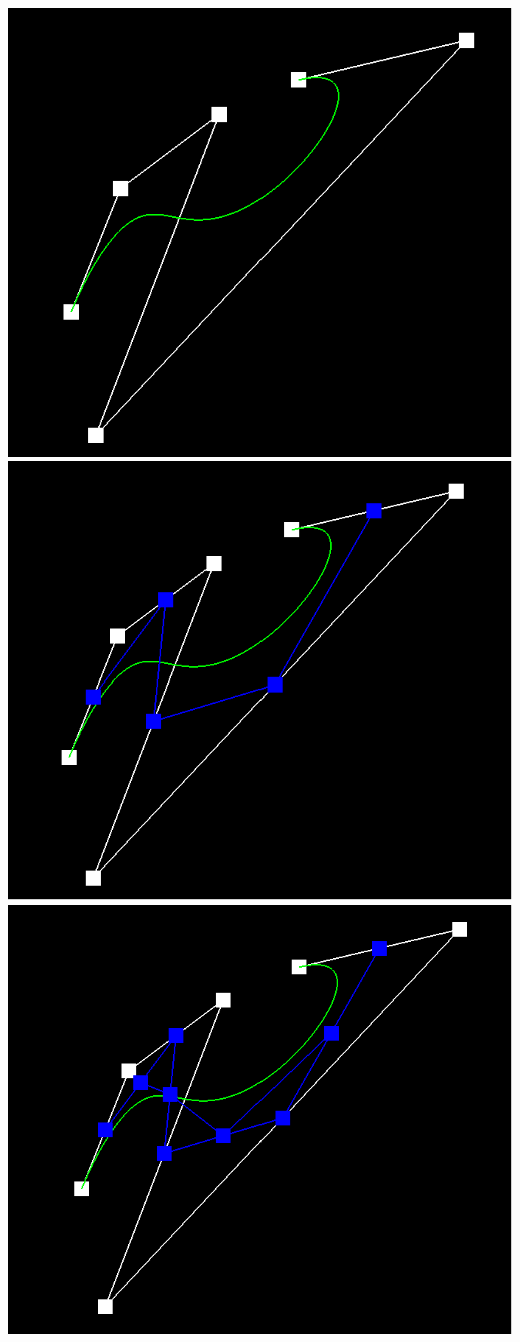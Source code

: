 \documentclass{article}
\begin{document}
\begin{center}
    \includegraphics[]{Part 1/step1.png}
    \includegraphics[]{Part 1/step2.png}
    \includegraphics[]{Part 1/step3.png}

\end{center}
\end{document}
